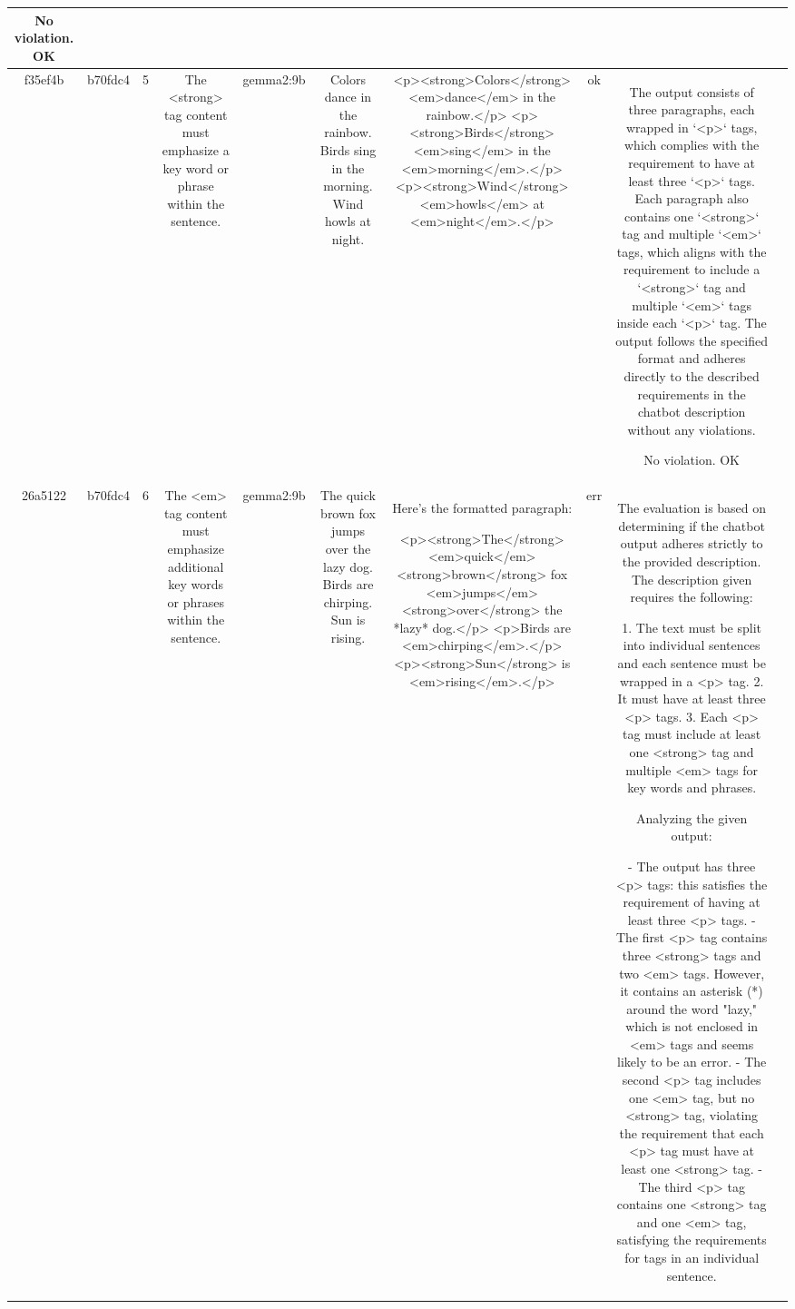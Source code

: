 \begin{table}[h!]
\begin{tabular}{|c|c|c|c|c|c|c|c|c|c|}
No violation.
OK & \\
\hline
f35ef4b & b70fdc4 & 5 & The <strong> tag content must emphasize a key word or phrase within the sentence. & gemma2:9b & Colors dance in the rainbow. Birds sing in the morning. Wind howls at night. & <p><strong>Colors</strong> <em>dance</em> in the rainbow.</p>
<p><strong>Birds</strong> <em>sing</em> in the <em>morning</em>.</p>
<p><strong>Wind</strong> <em>howls</em> at <em>night</em>.</p>
 & ok & The output consists of three paragraphs, each wrapped in `<p>` tags, which complies with the requirement to have at least three `<p>` tags. Each paragraph also contains one `<strong>` tag and multiple `<em>` tags, which aligns with the requirement to include a `<strong>` tag and multiple `<em>` tags inside each `<p>` tag. The output follows the specified format and adheres directly to the described requirements in the chatbot description without any violations. 

No violation.
OK & \\
\hline
26a5122 & b70fdc4 & 6 & The <em> tag content must emphasize additional key words or phrases within the sentence. & gemma2:9b & The quick brown fox jumps over the lazy dog. Birds are chirping. Sun is rising. & Here's the formatted paragraph:

<p><strong>The</strong> <em>quick</em> <strong>brown</strong> fox <em>jumps</em> <strong>over</strong> the *lazy* dog.</p>
<p>Birds are <em>chirping</em>.</p>
<p><strong>Sun</strong> is <em>rising</em>.</p>  


 & err & The evaluation is based on determining if the chatbot output adheres strictly to the provided description. The description given requires the following:

1. The text must be split into individual sentences and each sentence must be wrapped in a <p> tag.
2. It must have at least three <p> tags.
3. Each <p> tag must include at least one <strong> tag and multiple <em> tags for key words and phrases.

Analyzing the given output:

- The output has three <p> tags: this satisfies the requirement of having at least three <p> tags. 
- The first <p> tag contains three <strong> tags and two <em> tags. However, it contains an asterisk (*) around the word "lazy," which is not enclosed in <em> tags and seems likely to be an error.
- The second <p> tag includes one <em> tag, but no <strong> tag, violating the requirement that each <p> tag must have at least one <strong> tag.
- The third <p> tag contains one <strong> tag and one <em> tag, satisfying the requirements for tags in an individual sentence.


\end{tabular}
\end{table}

